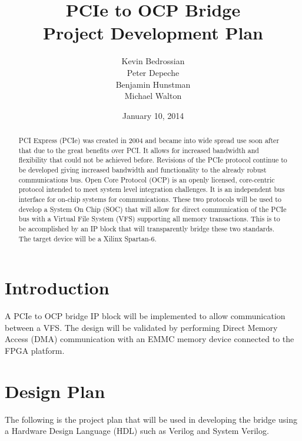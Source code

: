 \documentclass[]{report}   %
\begin{document}
\raggedright{}  %

\title{PCIe to OCP Bridge \\
  Project Development Plan
}   %

\author{Kevin Bedrossian \\
  Peter Depeche \\        %
  Benjamin Hunstman \\
  Michael Walton
}

\date{January 10, 2014}    %
\maketitle

\begin{abstract}
  PCI Express (PCIe) was created in 2004 and became into wide spread use soon after that due to the great benefits over PCI\@.
  It allows for increased bandwidth and flexibility that could not be achieved before\@.
  Revisions of the PCIe protocol continue to be developed giving increased bandwidth and functionality to the already robust communications bus\@.
  Open Core Protocol (OCP) is an openly licensed, core-centric protocol intended to meet system level integration challenges\@.
  It is an independent bus interface for on-chip systems for communications\@.
  These two protocols will be used to develop a System On Chip (SOC) that will allow for direct communication of the PCIe bus with a Virtual File System (VFS) supporting all memory transactions\@.
  This is to be accomplished by an IP block that will transparently bridge these two standards. The target device will be a Xilinx Spartan-6.
\end{abstract}

\tableofcontents

\chapter{Introduction}
A PCIe to OCP bridge IP block will be implemented to allow communication between a VFS\@.
The design will be validated by performing Direct Memory Access (DMA) communication with an EMMC memory device connected to the FPGA platform.

\chapter{Design Plan}
The following is the project plan that will be used in developing the bridge using a Hardware Design Language (HDL) such as Verilog and System Verilog.
\linebreak
\end{document}
